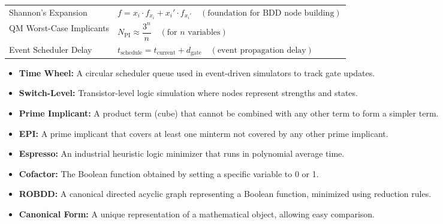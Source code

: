 \documentclass[12pt,a4paper]{article}
\renewcommand{\arraystretch}{1.45}
\begin{document}
\begin{tcolorbox}[formulabox, title={\textbf{Key Formulas and Metrics at a Glance}}]
\renewcommand{\arraystretch}{1.35}
\begin{tabularx}{\linewidth}{B{5.0cm} X}
  Shannon's Expansion & $f = x_i \cdot f_{x_i} + x_i' \cdot f_{x_i'} \quad (\text{foundation for BDD node building})$ \\[4pt]
  QM Worst-Case Implicants & $N_{\text{PI}} \approx \dfrac{3^n}{n} \quad (\text{for } n \text{ variables})$ \\[4pt]
  Event Scheduler Delay & $t_{\text{schedule}} = t_{\text{current}} + d_{\text{gate}} \quad (\text{event propagation delay})$
\end{tabularx}
\end{tcolorbox}

\vspace{6pt}

\begin{tcolorbox}[defbox, title={\textbf{One-Line Definitions}}]
\begin{itemize}[leftmargin=*, itemsep=3pt, topsep=0pt]
  \item \textbf{Time Wheel:} A circular scheduler queue used in event-driven simulators to track gate updates.
  \item \textbf{Switch-Level:} Transistor-level logic simulation where nodes represent strengths and states.
  \item \textbf{Prime Implicant:} A product term (cube) that cannot be combined with any other term to form a simpler term.
  \item \textbf{EPI:} A prime implicant that covers at least one minterm not covered by any other prime implicant.
  \item \textbf{Espresso:} An industrial heuristic logic minimizer that runs in polynomial average time.
  \item \textbf{Cofactor:} The Boolean function obtained by setting a specific variable to 0 or 1.
  \item \textbf{ROBDD:} A canonical directed acyclic graph representing a Boolean function, minimized using reduction rules.
  \item \textbf{Canonical Form:} A unique representation of a mathematical object, allowing easy comparison.
\end{itemize}
\end{tcolorbox}

\vspace{6pt}
\end{document}
